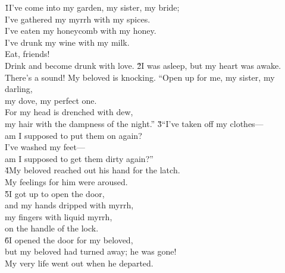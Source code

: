 
\begin{poetry}
\poeml {}
\v{1}I've come into my garden, my sister, my bride; \\
\poeml I've gathered my myrrh with my spices. \\
\poeml I've eaten my honeycomb with my honey. \\
\poeml I've drunk my wine with my milk. \\
\poeml Eat, friends! \\
\poemll    Drink and become drunk with love.
\poeml \v{2}I was asleep, but my heart was awake. \\
\poemll    There's a sound! My beloved is knocking.
\poeml ``Open up for me, my sister, my darling, \\
\poemll    my dove, my perfect one. \\
\poeml For my head is drenched with dew, \\
\poemll    my hair with the dampness of the night.''
\poeml \v{3}``I've taken off my clothes--- \\
\poemll    am I supposed to put them on again? \\
\poeml I've washed my feet--- \\
\poemll    am I supposed to get them dirty again?'' \\
\poeml \v{4}My beloved reached out his hand for the latch. \\
\poemll    My feelings for him were aroused. \\
\poeml \v{5}I got up to open the door, \\
\poemll    and my hands dripped with myrrh, \\
\poeml my fingers with liquid myrrh, \\
\poemll    on the handle of the lock. \\
\poeml \v{6}I opened the door for my beloved, \\
\poemll    but my beloved had turned away; he was gone! \\
\poeml My very life went out when he departed. \\

\end{poetry}
